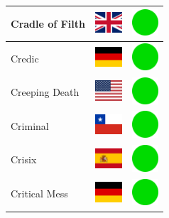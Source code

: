 \documentclass[12pt, a4paper, twoside]{report}
\begin{document}
\begin{center}
\begin{longtable}{|p{5cm}|p{2cm}|p{2cm}|}
Cradle of Filth & \includegraphics[width=1cm]{4x3/gb} & \includegraphics[width=1cm]{likes/y} \\ \hline
Credic & \includegraphics[width=1cm]{4x3/de} & \includegraphics[width=1cm]{likes/y} \\ \hline
Creeping Death & \includegraphics[width=1cm]{4x3/us} & \includegraphics[width=1cm]{likes/y} \\ \hline
Criminal & \includegraphics[width=1cm]{4x3/cl} & \includegraphics[width=1cm]{likes/y} \\ \hline
Crisix & \includegraphics[width=1cm]{4x3/es} & \includegraphics[width=1cm]{likes/y} \\ \hline
Critical Mess & \includegraphics[width=1cm]{4x3/de} & \includegraphics[width=1cm]{likes/y} \\ \hline

\end{longtable}
\end{center}
\end{document}
